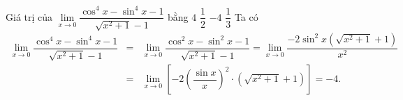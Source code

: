 \begin{ex}%
 Giá trị của $\lim\limits_{x\to 0} \dfrac{\cos^4 x - \sin^4 x - 1}{\sqrt{x^2+1} - 1}$ bằng
 \choice
  {$4$}
  {$\dfrac{1}{2}$}
  {\True $-4$}
  {$\dfrac{1}{3}$}
 \loigiai
  {
  Ta có
  \allowdisplaybreaks
  \begin{eqnarray*}
   \lim\limits_{x\to 0} \dfrac{\cos^4 x - \sin^4 x - 1}{\sqrt{x^2+1} - 1} &=& \lim\limits_{x\to 0} \dfrac{\cos^2 x - \sin^2 x - 1}{\sqrt{x^2+1}-1} = \lim\limits_{x\to 0}\dfrac{-2\sin^2 x\left(\sqrt{x^2+1}+1\right)}{x^2}\\
   &=& \lim\limits_{x\to 0} \left[-2 \left(\dfrac{\sin x}{x}\right)^2 \cdot \left(\sqrt{x^2+1}+1\right)\right]
   = -4.
  \end{eqnarray*}
  }
\end{ex}